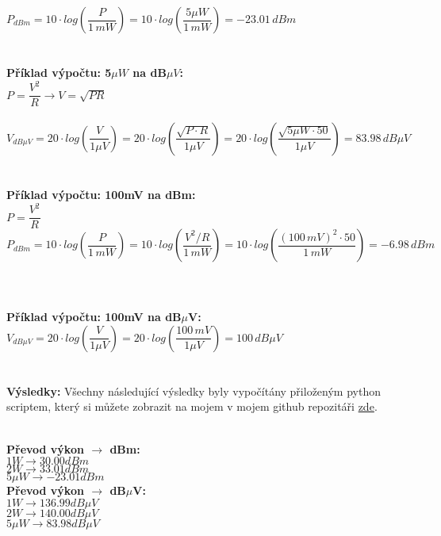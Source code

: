 \documentclass[10pt, a4paper]{article}%
\begin{document}
	$P_{dBm} = 10\cdot log\left( \dfrac{P}{1\,mW} \right) = 10\cdot log\left( \dfrac{5\mu W}{1\,mW} \right) = -23.01\,dBm$
	\\\\\\
	\textbf{Příklad výpočtu: 5$\mu W$ na dB$\mu V$:}\\
	$P = \dfrac{V^2}{R} \rightarrow V = \sqrt{PR}$\\\\
	$V_{dB\mu V} = 20\cdot log \left( \dfrac{V}{1\mu V} \right) = 20\cdot log \left( \dfrac{\sqrt{P\cdot R}}{1\mu V} \right)
	=20\cdot log \left( \dfrac{\sqrt{5\mu W \cdot 50}}{1\mu V} \right) = 83.98\,dB\mu V$
	\\\\\\
	\textbf{Příklad výpočtu: 100mV na dBm:}\\
	$P = \dfrac{V^2}{R}$\\
	$P_{dBm} = 10\cdot log\left( \dfrac{P}{1\,mW} \right) = 10\cdot log\left( \dfrac{ V^2/R}{1\,mW} \right)
	=10\cdot log\left( \dfrac{(100\,mV)^2 \cdot 50}{1\,mW} \right) = -6.98\,dBm $\\
	\\\\\\
	\textbf{Příklad výpočtu: 100mV na dB$\mu$V:}\\
	$V_{dB\mu V} = 20\cdot log \left( \dfrac{V}{1\mu V} \right) = 20\cdot log \left( \dfrac{100\,mV}{1\mu V} \right)
	= 100\,dB\mu V$
	\\\\\\
	\textbf{Výsledky:}
	Všechny následující výsledky byly vypočítány přiloženým python scriptem, který si můžete
	zobrazit na mojem v mojem github repozitáři
	\href{https://github.com/FilipPaul/ctvrtak_letni_semestr/blob/main/MKC_REM/ukol_1_prevod_jednotek/README.md}{\color{blue} zde}.
	\\\\
	\noindent
	\begin{minipage}[t]{0.5\textwidth}
		\textbf {Převod výkon $\rightarrow$ dBm:}\\
		$1W \rightarrow 30.00dBm$ \\
		$2W \rightarrow 33.01dBm$ \\
		$5\mu W \rightarrow -23.01dBm$ \\
		
		\textbf {Převod výkon $\rightarrow$ dB$\mu $V:}\\
		$1W \rightarrow 136.99dB\mu V$ \\
		$2W \rightarrow 140.00dB\mu V$ \\
		$5\mu W \rightarrow 83.98dB\mu V$ \\
	\end{minipage}%
\end{document}
